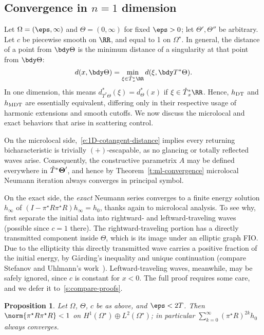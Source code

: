 \documentclass[10pt]{article}
\theoremstyle{plain}
\newtheorem{proposition}[theorem]{Proposition}
\theoremstyle{definition}
\theoremstyle{remark}
\numberwithin{theorem}{section}
\numberwithin{example}{section}
\numberwithin{equation}{section}
\numberwithin{figure}{section}
\newcommand\sref[1]{\textsection\ref{#1}}					%
\newcommand\bTheta{\boldsymbol\Theta}
\newcommand\To{\smash{\mathring T}\vphantom{T}}			%
\newcommand\DT{\ensuremath{_{\text{\normalfont DT}}}}		%
\newcommand\MDT{\ensuremath{_{\text{\normalfont MDT}}}}	%
\newcommand\Garding{G\aa{}rding}
\begin{document}
\subsection{Convergence in $n=1$ dimension}

Let $\Omega=(\eps,\infty)$ and $\Theta=(0,\infty)$ for fixed $\eps>0$; let $\Theta',\Theta''$ be arbitrary. Let $c$ be piecewise smooth on $\RR$, and equal to 1 on $\Omega^\star$. 
In general, the distance of a point from $\bdy\Theta$ is the minimum distance of a singularity at that point from $\bdy\Theta$:
\begin{equation}
	d(x,\bdy\Theta) = \min_{\xi\in \To^*_x\RR\vphantom{\mathring T}}d(\xi,\bdy T^*\Theta).
	\label{e:1D-cotangent-distance}
\end{equation}
In one dimension, this means $d^*_{T^*\Theta}(\xi)=d^*_\Theta(x)$ if $\xi\in\To^*_x\RR$. Hence, $h\DT$ and $h\MDT$ are essentially equivalent, differing only in their respective usage of harmonic extensions and smooth cutoffs. We now discuss the microlocal and exact behaviors that arise in scattering control.

On the microlocal side,~\eqref{e:1D-cotangent-distance} implies every returning bicharacteristic is trivially $(+)$-escapable, as no glancing or totally reflected waves arise. Consequently, the constructive parametrix $A$ may be defined everywhere in $\To^*\bTheta'$, and hence by Theorem~\ref{t:ml-convergence} microlocal Neumann iteration always converges in principal symbol.

On the exact side, the \emph{exact} Neumann series converges to a finite energy solution $h_\infty$ of $(I-\pi^\star R\pi^\star R)h_\infty=h_0$, thanks again to microlocal analysis. To see why, first separate the initial data into rightward- and leftward-traveling waves (possible since $c=1$ there). The rightward-traveling portion has a directly transmitted component inside $\Theta$, which is its image under an elliptic graph FIO. Due to the ellipticity this directly transmitted wave carries a positive fraction of the initial energy, by \Garding's inequality and unique continuation (compare Stefanov and Uhlmann's work~\cite{SU-TATBrain}). Leftward-traveling waves, meanwhile, may be safely ignored, since $c$ is constant for $x<0$. The full proof requires some care, and we defer it to~\sref{s:compare-proofs}.

\begin{proposition}
	Let $\Omega$, $\Theta$, $c$ be as above, and $\eps<2T$. Then $\norm{\pi^\star R\pi^\star R}<1$ on $H^1(\Omega^\star)\oplus L^2(\Omega^\star)$; in particular $\sum_{k=0}^\infty (\pi^\star R)^{2k}h_0$ always converges.
	\label{p:1D-convergence}
\end{proposition}
\end{document}
